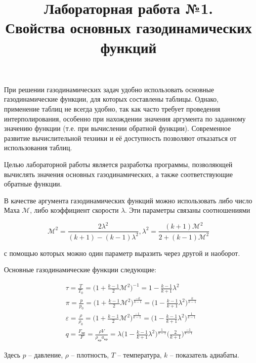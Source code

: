 \documentclass[12pt,a4paper,oneside]{book}
\title{Лабораторная работа №1. \\ Свойства основных газодинамических функций}
\author{}
\date{}
\newcommand*\Mach{\mathcal{M}}
\newcommand*\crit{\text{кр}}
\newcommand*\eps{\varepsilon}
\begin{document}
  
  \maketitle
  
  При решении газодинамических задач удобно использовать основные
  газодинамические функции, для которых составлены таблицы. Однако, применение
  таблиц не всегда удобно, так как часто требует проведения интерполирования,
  особенно при нахождении значения аргумента по заданному значению функции
  (т.е. при вычислении обратной функции). Современное развитие вычислительной
  техники и её доступность позволяют отказаться от использования таблиц.
  
  Целью лабораторной работы является разработка программы, позволяющей
  вычислять значения основных газодинамических, а также соответствующие
  обратные функции.
  
  В качестве аргумента газодинамических функций можно использовать либо
  число Маха $\Mach$, либо коэффициент скорости $\lambda$. Эти
  параметры связаны соотношениями
  
  \begin{equation*}
    \Mach^2 = \frac{2 \lambda^2}{(k + 1) - (k - 1) \lambda^2},
    \lambda^2 = \frac{(k + 1) \Mach^2}{2 + (k - 1) \Mach^2}
  \end{equation*}
  
  \noindent с помощью которых можно один параметр выразить через другой
  и наоборот.
  
  Основные газодинамические функции следующие:
  
  \begin{align*}
    & \tau = \frac{T}{T_0}
      = \Big( 1 + \frac{k - 1}{2} \Mach^2 \Big)^{-1}
      = 1 - \frac{k - 1}{k + 1} \lambda^2 \\
    & \pi = \frac{p}{p_0}
      = \Big( 1 + \frac{k - 1}{2} \Mach^2 \Big)^{\frac{-k}{k - 1}}
      = \Big( 1 - \frac{k - 1}{k + 1} \lambda^2 \Big)^{\frac{k}{k - 1}} \\
    & \eps = \frac{\rho}{\rho_0}
      = \Big( 1 + \frac{k - 1}{2} \Mach^2 \Big)^{\frac{-1}{k - 1}}
      = \Big( 1 - \frac{k - 1}{k + 1} \lambda^2 \Big)^{\frac{1}{k - 1}} \\
    & q = \frac{F_{\crit}}{F}
      = \frac{\rho V}{\rho_{\crit} a_{\crit}}
      = \lambda \Big( 1 - \frac{k - 1}{k + 1} \lambda^2 \Big)^{\frac{1}{k - 1}}
        \Big( \frac{2}{k + 1} \Big)^{\frac{-1}{k - 1}}
  \end{align*}
  
  \noindent Здесь $p$ -- давление, $\rho$ -- плотность, $T$ -- температура,
  $k$ -- показатель адиабаты.
  
\end{document}
